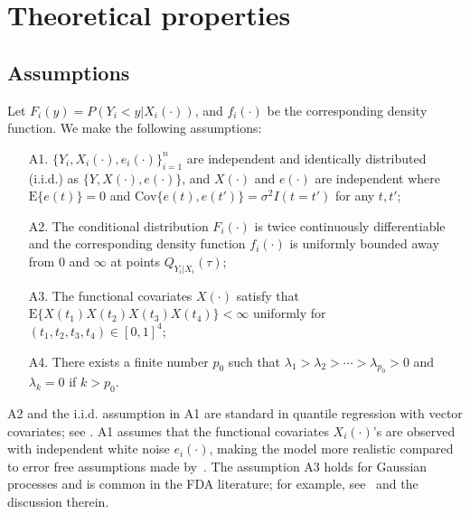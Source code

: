 \documentclass[times,sort&compress,3p]{elsarticle}
\theoremstyle{plain}%
\theoremstyle{definition}
\begin{document}
\section{Theoretical properties} 
\label{sec:ch4.asym}

\subsection{Assumptions} 
Let $F_{i}(y)=P(Y_{i}<y|X_{i}(\cdot))$, and $f_i(\cdot)$ be the corresponding density function. We make the following assumptions:
\begin{enumerate}
	\item[A1.] 
	$\{Y_i, X_i(\cdot), e_i(\cdot)\}_{i = 1}^{n}$ are independent and identically distributed (i.i.d.) as $\{Y, X(\cdot), e(\cdot)\}$, and $X(\cdot)$ and $e(\cdot)$ are independent where $\mathrm{E} \{e(t)\} = 0$ and $\text{Cov}\{e(t), e(t')\} = \sigma^2 I(t = t')$  for any $t, t'$; 
	\item[A2.]
	The conditional distribution $F_i(\cdot)$ is twice continuously differentiable and the corresponding density function $f_i(\cdot)$ is uniformly bounded away from 0 and $\infty$ at points $Q_{Y_i|X_i}(\tau)$; 
	\item[A3.] The functional covariates $X(\cdot)$ satisfy that $\text{E}\{ X(t_1) X(t_2)X(t_3) X(t_4)\} < \infty$ uniformly for $(t_1, t_2, t_3, t_4) \in [0, 1]^4$;
	\item[A4.] There exists a finite number $p_0$ such that $\lambda_1 > \lambda_2 > \cdots > \lambda_{p_0} > 0$ and $\lambda_k = 0$ if $k > p_0$. 
\end{enumerate}

A2 and the i.i.d. assumption in A1 are standard in quantile regression with vector covariates; see \cite[][Ch. 4]{koenker2005}.  A1 assumes that the functional covariates $X_i(\cdot)$'s are observed with independent white noise $e_i(\cdot)$, making the model more realistic compared to error free assumptions made by~\cite{Kato:12}. The assumption A3 holds for Gaussian processes and is common in the FDA literature; for example, see~\cite{Hall+:06} and the discussion therein. 
\end{document}
